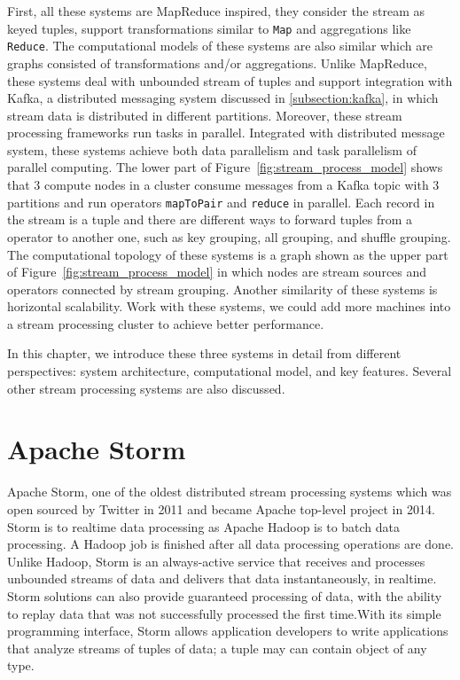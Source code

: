 First, all these systems are MapReduce inspired, they consider the stream as keyed tuples, support transformations similar to \texttt{Map} and aggregations like \texttt{Reduce}. The computational models of these systems are also similar which are graphs consisted of transformations and/or aggregations. Unlike MapReduce, these systems deal with unbounded stream of tuples and support integration with Kafka, a distributed messaging system discussed in \cref{subsection:kafka}, in which stream data is distributed in different partitions. Moreover, these stream processing frameworks run tasks in parallel. Integrated with distributed message system, these systems achieve both data parallelism and task parallelism of parallel computing. The lower part of Figure~\ref{fig:stream_process_model} shows that 3 compute nodes in a cluster consume messages from a Kafka topic with 3 partitions and run operators \texttt{mapToPair} and \texttt{reduce} in parallel. Each record in the stream is a tuple and there are different ways to forward tuples from a operator to another one, such as key grouping, all grouping, and shuffle grouping.  The computational topology of these systems is a graph shown as the upper part of Figure~\ref{fig:stream_process_model} in which nodes are stream sources and operators connected by stream grouping. Another similarity of these systems is horizontal scalability. Work with these systems, we could add more machines into a stream processing cluster to achieve better performance.


In this chapter, we introduce these three systems in detail from different perspectives: system architecture, computational model, and key features. Several other stream processing systems are also discussed. 
 
\section{Apache Storm}
Apache Storm, one of the oldest distributed stream processing systems which was open sourced by Twitter in 2011 and became Apache top-level project in 2014.  Storm is to realtime data processing as Apache Hadoop is to batch data processing. A Hadoop job is finished after all data processing operations are done. Unlike Hadoop, Storm is an always-active service that receives and processes unbounded streams of data and delivers that data instantaneously, in realtime. Storm solutions can also provide guaranteed processing of data, with the ability to replay data that was not successfully processed the first time.With its simple programming interface, Storm allows application developers to write applications that analyze streams of tuples of data; a tuple may can contain object of any type.

